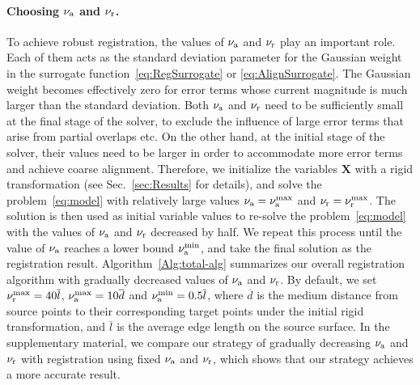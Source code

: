\paragraph{Choosing $\nu_{\textrm{a}}$ and $\nu_{\textrm{r}}$.}
To achieve robust registration, the values of $\nu_{\textrm{a}}$ and $\nu_{\textrm{r}}$ play an important role. Each of them acts as the standard deviation parameter for the Gaussian weight in the surrogate function~\eqref{eq:RegSurrogate} or \eqref{eq:AlignSurrogate}. The Gaussian weight becomes effectively zero for error terms whose current magnitude is much larger than the standard deviation. Both $\nu_{\textrm{a}}$ and $\nu_{\textrm{r}}$ need to be sufficiently small at the final stage of the solver, to exclude the influence of large error terms that arise from partial overlaps etc. On the other hand, at the initial stage of the solver, their values need to be larger in order to accommodate more error terms and achieve coarse alignment. Therefore, we initialize the variables $\mathbf{X}$ with a rigid transformation (see Sec.~\ref{sec:Results} for details), and solve the problem~\eqref{eq:model} with relatively large values $\nu_{\textrm{a}} = \nu_{\textrm{a}}^{\max}$ and $\nu_{\textrm{r}} = \nu_{\textrm{r}}^{\max}$. The solution is then used as initial variable values to re-solve the problem~\eqref{eq:model} with the values of $\nu_{\textrm{a}}$ and $\nu_{\textrm{r}}$ decreased by half. We repeat this process until the value of $\nu_{\textrm{a}}$ reaches a lower bound $\nu_{\textrm{a}}^{\min}$, and take the final solution as the registration result. Algorithm~\ref{Alg:total-alg} summarizes our overall registration algorithm with gradually decreased values of $\nu_{\textrm{a}}$ and $\nu_{\textrm{r}}$.
By default, we set $\nu_{\textrm{r}}^{\max} = 40 \overline{l}$, $\nu_{\textrm{a}}^{\max} = 10 \overline{d}$ and $\nu_{\textrm{a}}^{\min} = 0.5 \overline{l}$, where $\overline{d}$ is the medium distance from source points to their corresponding target points under the initial rigid transformation, and $\overline{l}$ is the average edge length on the source surface. In the supplementary material, we compare our strategy of gradually decreasing $\nu_{\textrm{a}}$ and $\nu_{\textrm{r}}$ with registration using fixed $\nu_{\textrm{a}}$ and $\nu_{\textrm{r}}$, which shows that our strategy achieves a more accurate result.



